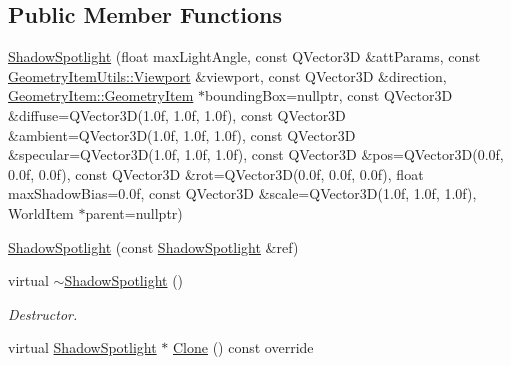 \subsection*{Public Member Functions}
\begin{DoxyCompactItemize}
\item 
\mbox{\hyperlink{class_geometry_engine_1_1_geometry_world_item_1_1_geometry_light_1_1_shadow_spotlight_a65a4479d2d4e1011016a833d97caddc0}{Shadow\+Spotlight}} (float max\+Light\+Angle, const Q\+Vector3D \&att\+Params, const \mbox{\hyperlink{class_geometry_engine_1_1_geometry_item_utils_1_1_viewport}{Geometry\+Item\+Utils\+::\+Viewport}} \&viewport, const Q\+Vector3D \&direction, \mbox{\hyperlink{class_geometry_engine_1_1_geometry_world_item_1_1_geometry_item_1_1_geometry_item}{Geometry\+Item\+::\+Geometry\+Item}} $\ast$bounding\+Box=nullptr, const Q\+Vector3D \&diffuse=Q\+Vector3D(1.\+0f, 1.\+0f, 1.\+0f), const Q\+Vector3\+D \&ambient=\+Q\+Vector3\+D(1.\+0f, 1.\+0f, 1.\+0f), const Q\+Vector3\+D \&specular=\+Q\+Vector3\+D(1.\+0f, 1.\+0f, 1.\+0f), const Q\+Vector3\+D \&pos=\+Q\+Vector3\+D(0.\+0f, 0.\+0f, 0.\+0f), const Q\+Vector3\+D \&rot=\+Q\+Vector3\+D(0.\+0f, 0.\+0f, 0.\+0f), float max\+Shadow\+Bias=0.\+0f, const Q\+Vector3\+D \&scale=\+Q\+Vector3\+D(1.\+0f, 1.\+0f, 1.\+0f), World\+Item $\ast$parent=nullptr)
\item 
\mbox{\hyperlink{class_geometry_engine_1_1_geometry_world_item_1_1_geometry_light_1_1_shadow_spotlight_a8757a401616b581827158f64eb176964}{Shadow\+Spotlight}} (const \mbox{\hyperlink{class_geometry_engine_1_1_geometry_world_item_1_1_geometry_light_1_1_shadow_spotlight}{Shadow\+Spotlight}} \&ref)
\item 
\mbox{\label{class_geometry_engine_1_1_geometry_world_item_1_1_geometry_light_1_1_shadow_spotlight_a1f4f0d06e4d09e72486844832122c01a}} 
virtual \mbox{\hyperlink{class_geometry_engine_1_1_geometry_world_item_1_1_geometry_light_1_1_shadow_spotlight_a1f4f0d06e4d09e72486844832122c01a}{$\sim$\+Shadow\+Spotlight}} ()
\begin{DoxyCompactList}\small\item\em Destructor. \end{DoxyCompactList}\item 
virtual \mbox{\hyperlink{class_geometry_engine_1_1_geometry_world_item_1_1_geometry_light_1_1_shadow_spotlight}{Shadow\+Spotlight}} $\ast$ \mbox{\hyperlink{class_geometry_engine_1_1_geometry_world_item_1_1_geometry_light_1_1_shadow_spotlight_a0ea8fd05d26f6e780d352168c28f940d}{Clone}} () const override
\end{DoxyCompactItemize}
